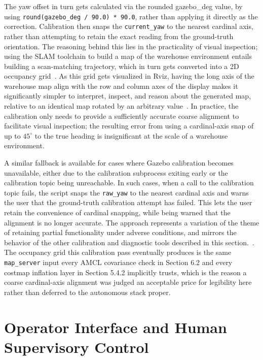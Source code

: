 The yaw offset in turn gets calculated via the rounded gazebo\_deg value, by using \texttt{round(gazebo\_deg / 90.0) * 90.0}, rather than applying it directly as the correction. Calibration then snaps the \texttt{current\_yaw} to the nearest cardinal axis, rather than attempting to retain the exact reading from the ground-truth orientation. The reasoning behind this lies in the practicality of visual inspection; using the SLAM toolchain to build a map of the warehouse environment entails building a scan-matching trajectory, which in turn gets converted into a 2D occupancy grid~\cite{macenski2021slam}. As this grid gets visualized in Rviz, having the long axis of the warehouse map align with the row and column axes of the display makes it significantly simpler to interpret, inspect, and reason about the generated map, relative to an identical map rotated by an arbitrary value~\cite{ribeiro2025indoor}. In practice, the calibration only needs to provide a sufficiently accurate coarse alignment to facilitate visual inspection; the resulting error from using a cardinal-axis snap of up to $45^\circ$ to the true heading is insignificant at the scale of a warehouse environment.

A similar fallback is available for cases where Gazebo calibration becomes unavailable, either due to the calibration subprocess exiting early or the calibration topic being unreachable. In such cases, when a call to the calibration topic fails, the script snaps the \texttt{raw\_yaw} to the nearest cardinal axis and warns the user that the ground-truth calibration attempt has failed. This lets the user retain the convenience of cardinal snapping, while being warned that the alignment is no longer accurate. The approach represents a variation of the theme of retaining partial functionality under adverse conditions, and mirrors the behavior of the other calibration and diagnostic tools described in this section.~\cite{kagizman2026lowcost}. The occupancy grid this calibration pass eventually produces is the same \texttt{map\_server} input every AMCL covariance check in Section 6.2 and every costmap inflation layer in Section 5.4.2 implicitly trusts, which is the reason a coarse cardinal-axis alignment was judged an acceptable price for legibility here rather than deferred to the autonomous stack proper.

\section{Operator Interface and Human Supervisory Control}

